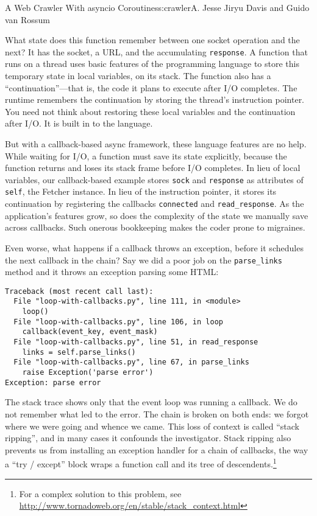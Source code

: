 \begin{aosachapter}{A Web Crawler With asyncio Coroutines}{s:crawler}{A. Jesse Jiryu Davis and Guido van Rossum}
\begin{Shaded}
\begin{Highlighting}[]
\end{Highlighting}
\end{Shaded}

What state does this function remember between one socket operation and
the next? It has the socket, a URL, and the accumulating
\texttt{response}. A function that runs on a thread uses basic features
of the programming language to store this temporary state in local
variables, on its stack. The function also has a ``continuation''---that
is, the code it plans to execute after I/O completes. The runtime
remembers the continuation by storing the thread's instruction pointer.
You need not think about restoring these local variables and the
continuation after I/O. It is built in to the language.

But with a callback-based async framework, these language features are
no help. While waiting for I/O, a function must save its state
explicitly, because the function returns and loses its stack frame
before I/O completes. In lieu of local variables, our callback-based
example stores \texttt{sock} and \texttt{response} as attributes of
\texttt{self}, the Fetcher instance. In lieu of the instruction pointer,
it stores its continuation by registering the callbacks
\texttt{connected} and \texttt{read\_response}. As the application's
features grow, so does the complexity of the state we manually save
across callbacks. Such onerous bookkeeping makes the coder prone to
migraines.

Even worse, what happens if a callback throws an exception, before it
schedules the next callback in the chain? Say we did a poor job on the
\texttt{parse\_links} method and it throws an exception parsing some
HTML:

\begin{verbatim}
Traceback (most recent call last):
  File "loop-with-callbacks.py", line 111, in <module>
    loop()
  File "loop-with-callbacks.py", line 106, in loop
    callback(event_key, event_mask)
  File "loop-with-callbacks.py", line 51, in read_response
    links = self.parse_links()
  File "loop-with-callbacks.py", line 67, in parse_links
    raise Exception('parse error')
Exception: parse error
\end{verbatim}

The stack trace shows only that the event loop was running a callback.
We do not remember what led to the error. The chain is broken on both
ends: we forgot where we were going and whence we came. This loss of
context is called ``stack ripping'', and in many cases it confounds the
investigator. Stack ripping also prevents us from installing an
exception handler for a chain of callbacks, the way a ``try / except''
block wraps a function call and its tree of descendents.\footnote{For a
  complex solution to this problem, see
  \url{http://www.tornadoweb.org/en/stable/stack_context.html}}


\end{aosachapter}
